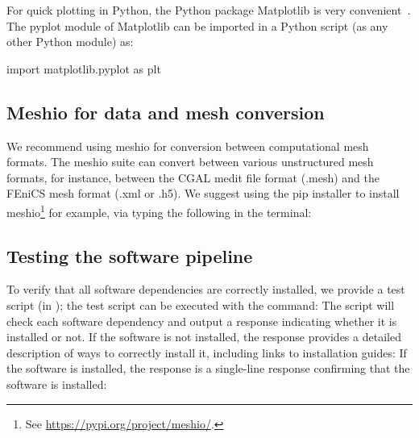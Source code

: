 
For quick plotting in Python, the Python package Matplotlib
is very convenient~\cite{hunter2007matplotlib}. The pyplot module of
Matplotlib can be imported in a Python script (as any other Python
module) as:
\begin{python}
import matplotlib.pyplot as plt
\end{python}

\subsection{Meshio for data and mesh conversion}
\label{sec:chp2:meshio}

We recommend using meshio \cite{schlomer2020nschloe} for conversion
between computational mesh formats. The meshio suite can convert
between various unstructured mesh formats, for instance, between the
CGAL medit file format (.mesh) and the FEniCS mesh format (.xml or
.h5). We suggest using the pip installer to install meshio\footnote{See \url{https://pypi.org/project/meshio/}.} for example, via typing the following in the terminal:

\subsection{Testing the software pipeline}
\label{sec:chp2:tools:testing}

To verify that all software dependencies are correctly installed, we
provide a test script (in ); the test script can 
be executed with the command:
The script will check each software dependency and output a response indicating 
whether it is installed or not. 
If the software is not installed, the response provides a detailed description of ways to correctly install it, including links to installation guides: 
If the software is installed, the response is a single-line response confirming that the software is installed:


